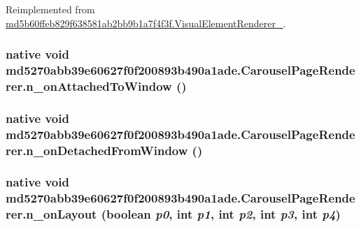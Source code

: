 Reimplemented from \hyperlink{classmd5b60ffeb829f638581ab2bb9b1a7f4f3f_1_1_visual_element_renderer__1_4a1c180026d8eab71549e47b7de4b9b8}{md5b60ffeb829f638581ab2bb9b1a7f4f3f.VisualElementRenderer\_}.\hypertarget{classmd5270abb39e60627f0f200893b490a1ade_1_1_carousel_page_renderer_3f13b7b13f3447c1c7192520900c5777}{
\subsubsection[{n\_\-onAttachedToWindow}]{\setlength{\rightskip}{0pt plus 5cm}native void md5270abb39e60627f0f200893b490a1ade.CarouselPageRenderer.n\_\-onAttachedToWindow ()}}
\label{classmd5270abb39e60627f0f200893b490a1ade_1_1_carousel_page_renderer_3f13b7b13f3447c1c7192520900c5777}


\hypertarget{classmd5270abb39e60627f0f200893b490a1ade_1_1_carousel_page_renderer_8d62856586e2da23d0d3f8f26d5bd4ba}{
\subsubsection[{n\_\-onDetachedFromWindow}]{\setlength{\rightskip}{0pt plus 5cm}native void md5270abb39e60627f0f200893b490a1ade.CarouselPageRenderer.n\_\-onDetachedFromWindow ()}}
\label{classmd5270abb39e60627f0f200893b490a1ade_1_1_carousel_page_renderer_8d62856586e2da23d0d3f8f26d5bd4ba}


\hypertarget{classmd5270abb39e60627f0f200893b490a1ade_1_1_carousel_page_renderer_20a089cd60211dba7bd4767bee115a9e}{
\subsubsection[{n\_\-onLayout}]{\setlength{\rightskip}{0pt plus 5cm}native void md5270abb39e60627f0f200893b490a1ade.CarouselPageRenderer.n\_\-onLayout (boolean {\em p0}, \/  int {\em p1}, \/  int {\em p2}, \/  int {\em p3}, \/  int {\em p4})}}
\label{classmd5270abb39e60627f0f200893b490a1ade_1_1_carousel_page_renderer_20a089cd60211dba7bd4767bee115a9e}




